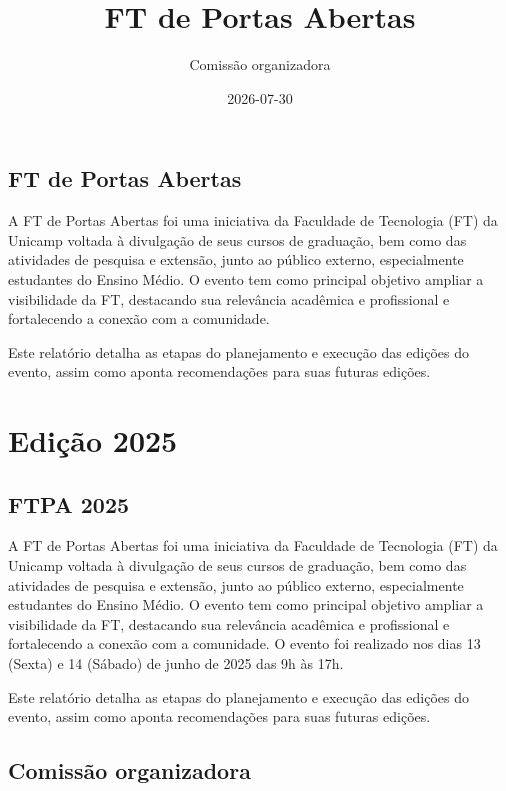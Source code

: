 \documentclass[
  letterpaper,
  DIV=11,
  numbers=noendperiod]{scrreprt}
\title{FT de Portas Abertas}
\author{Comissão organizadora}
\date{2026-07-30}
\renewcommand*\contentsname{Table of contents}
\newcommand\contentsname{Table of contents}
\begin{document}
\maketitle

\renewcommand*\contentsname{Table of contents}
{
\hypersetup{linkcolor=}
\setcounter{tocdepth}{2}
\tableofcontents
}

\chapter{FT de Portas Abertas}\label{ft-de-portas-abertas}

A FT de Portas Abertas foi uma iniciativa da Faculdade de Tecnologia
(FT) da Unicamp voltada à divulgação de seus cursos de graduação, bem
como das atividades de pesquisa e extensão, junto ao público externo,
especialmente estudantes do Ensino Médio. O evento tem como principal
objetivo ampliar a visibilidade da FT, destacando sua relevância
acadêmica e profissional e fortalecendo a conexão com a comunidade.

Este relatório detalha as etapas do planejamento e execução das edições
do evento, assim como aponta recomendações para suas futuras edições.

\part{\textbf{Edição 2025}}

\chapter{FTPA 2025}\label{ftpa-2025}

A FT de Portas Abertas foi uma iniciativa da Faculdade de Tecnologia
(FT) da Unicamp voltada à divulgação de seus cursos de graduação, bem
como das atividades de pesquisa e extensão, junto ao público externo,
especialmente estudantes do Ensino Médio. O evento tem como principal
objetivo ampliar a visibilidade da FT, destacando sua relevância
acadêmica e profissional e fortalecendo a conexão com a comunidade. O
evento foi realizado nos dias 13 (Sexta) e 14 (Sábado) de junho de 2025
das 9h às 17h.

Este relatório detalha as etapas do planejamento e execução das edições
do evento, assim como aponta recomendações para suas futuras edições.

\chapter{Comissão organizadora}\label{comissuxe3o-organizadora}
\end{document}
